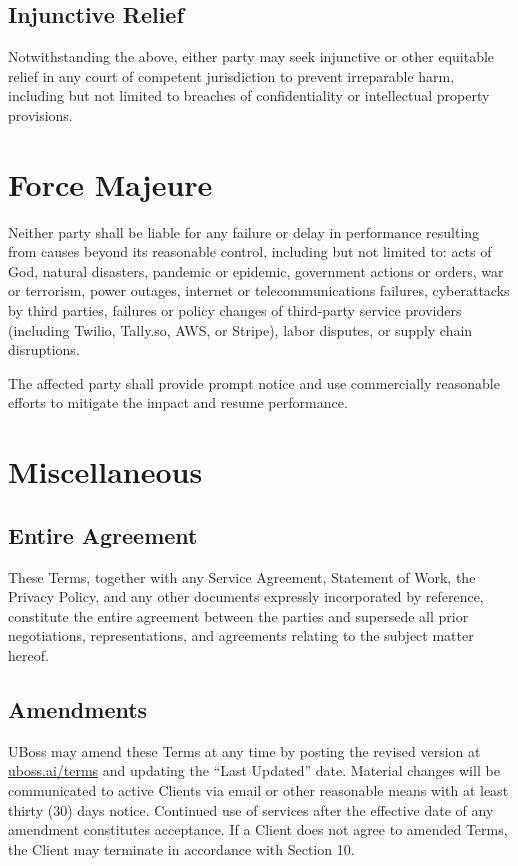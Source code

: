 \documentclass[11pt,letterpaper,parskip=half]{scrartcl}
\begin{document}
\subsection{Injunctive Relief}

Notwithstanding the above, either party may seek injunctive or other equitable relief in any court of competent jurisdiction to prevent irreparable harm, including but not limited to breaches of confidentiality or intellectual property provisions.

\section{Force Majeure}

Neither party shall be liable for any failure or delay in performance resulting from causes beyond its reasonable control, including but not limited to: acts of God, natural disasters, pandemic or epidemic, government actions or orders, war or terrorism, power outages, internet or telecommunications failures, cyberattacks by third parties, failures or policy changes of third-party service providers (including Twilio, Tally.so, AWS, or Stripe), labor disputes, or supply chain disruptions.

The affected party shall provide prompt notice and use commercially reasonable efforts to mitigate the impact and resume performance.

\section{Miscellaneous}

\subsection{Entire Agreement}

These Terms, together with any Service Agreement, Statement of Work, the Privacy Policy, and any other documents expressly incorporated by reference, constitute the entire agreement between the parties and supersede all prior negotiations, representations, and agreements relating to the subject matter hereof.

\subsection{Amendments}

UBoss may amend these Terms at any time by posting the revised version at \href{https://uboss.ai/terms}{uboss.ai/terms} and updating the ``Last Updated'' date. Material changes will be communicated to active Clients via email or other reasonable means with at least thirty (30) days notice. Continued use of services after the effective date of any amendment constitutes acceptance. If a Client does not agree to amended Terms, the Client may terminate in accordance with Section 10.
\end{document}
